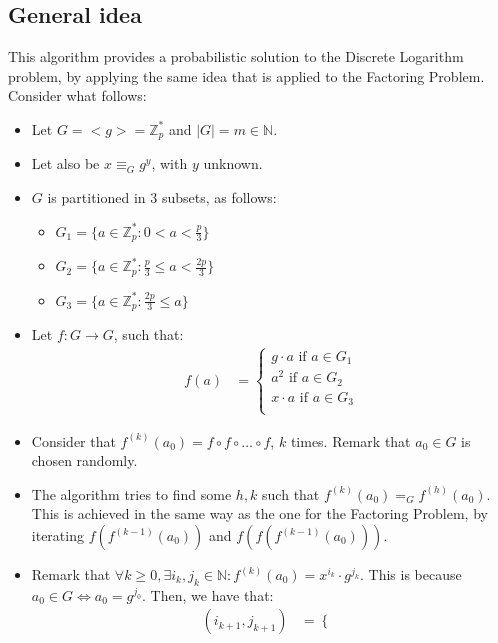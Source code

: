 \subsection{General idea}
This algorithm provides a probabilistic solution to the Discrete Logarithm problem, by applying the same idea that is applied to the Factoring Problem.\newline
Consider what follows:
\begin{itemize}
    \item Let $G = <g> = \mathbb{Z}_{p}^{*}$ and $|G| = m \in \mathbb{N}$.
    \item Let also be $x \equiv_{G} g^{y}$, with $y$ unknown.
    \item $G$ is partitioned in 3 subsets, as follows:
    \begin{itemize}
        \item $G_1 = \{a \in \mathbb{Z}_{p}^{*}: 0 < a < \frac{p}{3}\}$
        \item $G_2 = \{a \in \mathbb{Z}_{p}^{*}: \frac{p}{3} \leq a < \frac{2p}{3}\}$
        \item $G_3 = \{a \in \mathbb{Z}_{p}^{*}: \frac{2p}{3} \leq a\}$
    \end{itemize}
    \item Let $f: G \rightarrow G$, such that:
    \begin{align*}
        f(a) &=
        \begin{cases}
            g \cdot a \text{ if } a \in G_1 \\
            a^2 \text{ if } a \in G_2 \\
            x \cdot a \text{ if } a \in G_3 \\
        \end{cases}
    \end{align*}
    \item Consider that $f^{(k)}(a_0) = f \circ f \circ \dots \circ f$, $k$ times. Remark that $a_0 \in G$ is chosen randomly.
    \item The algorithm tries to find some $h, k$ such that $f^{(k)}(a_0) =_{G} f^{(h)}(a_0)$. This is achieved in the same way as the one for the Factoring Problem, by iterating $f(f^{(k - 1)}(a_0))$ and $f(f(f^{(k - 1)}(a_0)))$.
    \item Remark that $\forall k \geq 0, \exists i_{k}, j_{k} \in \mathbb{N}: f^{(k)}(a_0) = x^{i_k} \cdot g^{j_k}$. This is because $a_0 \in G \iff a_0 = g^{j_0}$. Then, we have that:
    \begin{align*}
        (i_{k+1}, j_{k+1}) &=
        \begin{cases}

\end{cases}
\end{align*}
\end{itemize}
